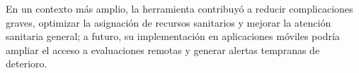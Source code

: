 \documentclass[12pt,letterpaper]{report}
\begin{document}
En un contexto más amplio, la herramienta contribuyó a reducir complicaciones graves, optimizar la asignación de recursos sanitarios y mejorar la atención sanitaria general; a futuro, su implementación en aplicaciones móviles podría ampliar el acceso a evaluaciones remotas y generar alertas tempranas de deterioro.
%
%
%    
%

\end{document}
